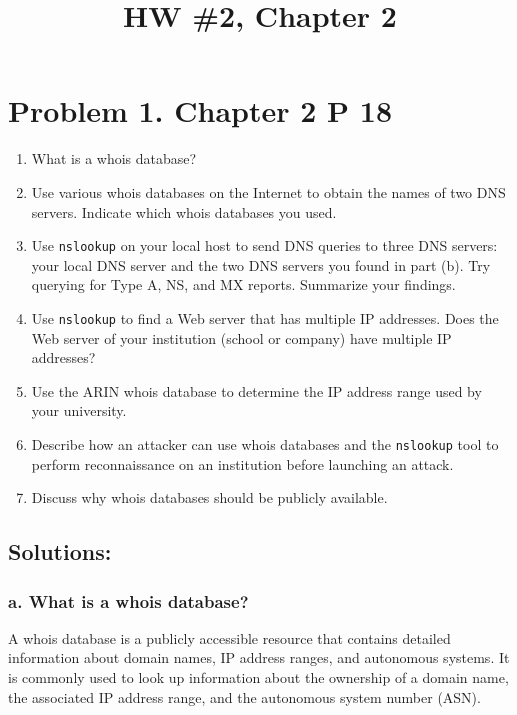 \documentclass{cshwk}
\begin{document}
\title{HW \#2, Chapter 2}

\maketitle

\section*{Problem 1. Chapter 2 P 18}

\begin{enumerate}
    \renewcommand{\labelenumi}{(\alph{enumi})}
    \item What is a whois database?
    \item Use various whois databases on the Internet to obtain the names of two DNS servers. Indicate which whois databases you used.
    \item Use \texttt{nslookup} on your local host to send DNS queries to three DNS servers: your local DNS server and the two DNS servers you found in part (b). Try querying for Type A, NS, and MX reports. Summarize your findings.
    \item Use \texttt{nslookup} to find a Web server that has multiple IP addresses. Does the Web server of your institution (school or company) have multiple IP addresses?
    \item Use the ARIN whois database to determine the IP address range used by your university.
    \item Describe how an attacker can use whois databases and the \texttt{nslookup} tool to perform reconnaissance on an institution before launching an attack.
    \item Discuss why whois databases should be publicly available.
\end{enumerate}

\subsection*{Solutions:}

\subsubsection*{a. What is a whois database?}

A whois database is a publicly accessible resource that contains detailed information about domain names, IP address ranges, and autonomous systems. It is commonly used to look up information about the ownership of a domain name, the associated IP address range, and the autonomous system number (ASN).
\end{document}
